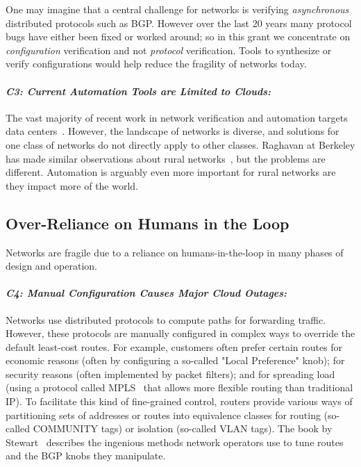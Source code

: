 One may imagine that a central challenge for networks is verifying {\em asynchronous} distributed protocols such as BGP.  However over the last 20 years many protocol bugs have either been fixed or worked around; so in this grant we concentrate on {\em configuration} verification and not {\em protocol} verification.  Tools to synthesize or verify configurations would help reduce the fragility of networks today.

\paragraph*{\em C3: Current Automation Tools are Limited to Clouds:}
%
The vast majority of recent work in network verification and automation targets data centers~\cite{hsa, surgeries, libra, DBLP:conf/popl/FosterKM0T15}. However, the landscape of networks is diverse, and solutions for one class of networks do not directly apply to other classes.   Raghavan at Berkeley has made similar observations about rural networks~\cite{barath}, but the problems are different.  Automation is arguably even more important for rural networks are they impact more of the world.

\subsection{Over-Reliance on Humans in the Loop}
%
Networks are fragile due to a reliance on humans-in-the-loop in many phases of design and operation.

\paragraph*{\em C4: Manual Configuration Causes Major Cloud Outages:}
Networks use distributed protocols to compute paths for forwarding
traffic.  However, these protocols are manually configured in complex
ways to override the default least-cost routes.  For example,
customers often prefer certain routes for economic reasons (often by
configuring a so-called "Local Preference" knob); for security reasons
(often implemented by packet filters); and for spreading load (using a
protocol called MPLS~\cite{MPLSIna} that allows more flexible routing
than traditional IP). To facilitate this kind of fine-grained control,
routers provide various ways of partitioning sets of addresses or
routes into equivalence classes for routing (so-called COMMUNITY tags)
or isolation (so-called VLAN tags). The book by Stewart~\cite{stewart}
describes the ingenious methods network operators use to tune routes
and the BGP knobs they manipulate.

